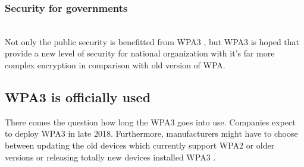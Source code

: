 \subsubsection{Security for governments}~\\
Not only the public security is benefitted from WPA3 \cite{hoffman_2018}, but WPA3 \cite{hoffman_2018} is hoped that provide a new level of security for national organization with it’s far more complex encryption in comparison with old version of WPA.
\subsection{WPA3 is officially used }
There comes the question how long the WPA3 \cite{hoffman_2018} goes into use. Companies expect to deploy WPA3 \cite{hoffman_2018} in late 2018. Furthermore, manufacturers might have to choose between updating the old devices which currently support WPA2 or older versions or releasing totally new devices installed WPA3 \cite{hoffman_2018}.